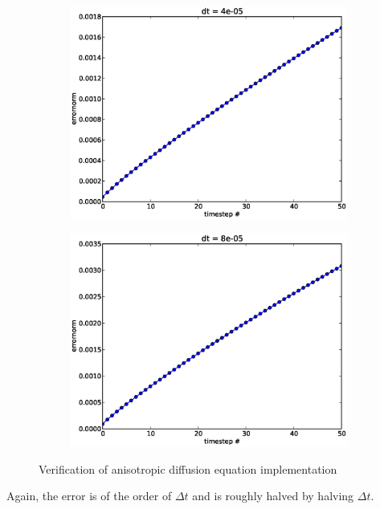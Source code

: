 \begin{figure}[H]
\centering
\begin{subfigure}[b]{0.48\textwidth}
\includegraphics[width=\textwidth]{../doc/results/experiment_05112013_1303/results/deterministic_errorplot.eps}
\caption{}
\label{anisotropic_diffusion_verification:single_dt}
\end{subfigure}
\begin{subfigure}[b]{0.48\textwidth}
\includegraphics[width=\textwidth]{../doc/results/experiment_05112013_1304/results/deterministic_errorplot.eps}
\caption{}
\label{anisotropic_diffusion_verification:double_dt}
\end{subfigure}
\caption[Verification of anisotropic diffusion equation implementation]{Verification of anisotropic diffusion equation implementation}
\label{anisotropic_diffusion_verification}
\end{figure}
Again, the error is of the order of $\Delta t$ and is roughly halved by halving $\Delta t$.
